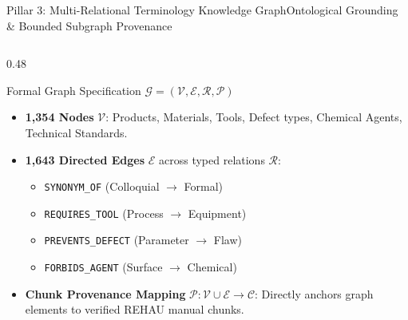 \documentclass[aspectratio=169,10pt]{beamer}
\begin{document}
\begin{frame}{Pillar 3: Multi-Relational Terminology Knowledge Graph}{Ontological Grounding \& Bounded Subgraph Provenance}
  \begin{columns}[T]
    \begin{column}{0.48\textwidth}
      \begin{block}{Formal Graph Specification $\mathcal{G} = (\mathcal{V}, \mathcal{E}, \mathcal{R}, \mathcal{P})$}
        \scriptsize
        \begin{itemize}\setlength\itemsep{0.03ex}
          \item \textbf{1,354 Nodes} $\mathcal{V}$: Products, Materials, Tools, Defect types, Chemical Agents, Technical Standards.
          \item \textbf{1,643 Directed Edges} $\mathcal{E}$ across typed relations $\mathcal{R}$:
            \begin{itemize}\setlength\itemsep{0.02ex}
              \item \texttt{SYNONYM\_OF} (Colloquial $\to$ Formal)
              \item \texttt{REQUIRES\_TOOL} (Process $\to$ Equipment)
              \item \texttt{PREVENTS\_DEFECT} (Parameter $\to$ Flaw)
              \item \texttt{FORBIDS\_AGENT} (Surface $\to$ Chemical)
            \end{itemize}
          \item \textbf{Chunk Provenance Mapping} $\mathcal{P}: \mathcal{V} \cup \mathcal{E} \to \mathcal{C}$: Directly anchors graph elements to verified REHAU manual chunks.
        \end{itemize}
      \end{block}
    \end{column}


\end{columns}
\end{frame}
\end{document}

